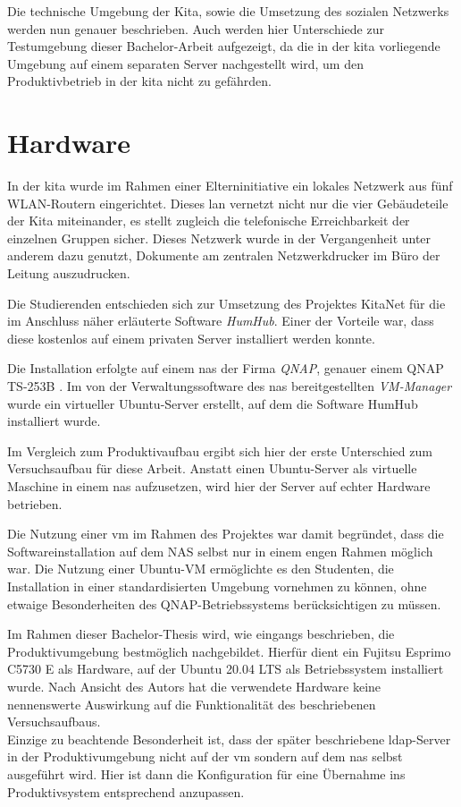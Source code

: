 Die technische Umgebung der Kita, sowie die Umsetzung des sozialen Netzwerks werden nun genauer beschrieben. Auch werden hier Unterschiede zur Testumgebung dieser Bachelor-Arbeit aufgezeigt, da die in der \ac{kita} vorliegende Umgebung auf einem separaten Server nachgestellt wird, um den Produktivbetrieb in der \ac{kita} nicht zu gefährden.

\section{Hardware}

In der \ac{kita} wurde im Rahmen einer Elterninitiative ein lokales Netzwerk  aus fünf WLAN-Routern eingerichtet. Dieses \ac{lan} vernetzt nicht nur die vier Gebäudeteile der Kita miteinander, es stellt zugleich die telefonische Erreichbarkeit der einzelnen Gruppen sicher. Dieses Netzwerk wurde in der Vergangenheit unter anderem dazu genutzt, Dokumente am zentralen Netzwerkdrucker im Büro der Leitung auszudrucken.

Die Studierenden entschieden sich zur Umsetzung des Projektes KitaNet für die im Anschluss näher erläuterte Software \textit{HumHub}.
Einer der Vorteile war, dass diese kostenlos auf einem privaten Server installiert werden konnte. 

Die Installation erfolgte auf einem \ac{nas} der Firma \textit{QNAP}, genauer einem QNAP TS-253B \citep[vgl.][]{qnap}. 
Im von der Verwaltungssoftware des \ac{nas} bereitgestellten \textit{VM-Manager} wurde ein virtueller Ubuntu-Server erstellt, auf dem die Software HumHub installiert wurde.

Im Vergleich zum Produktivaufbau ergibt sich hier der erste Unterschied zum Versuchsaufbau für diese Arbeit.
Anstatt einen Ubuntu-Server als virtuelle Maschine in einem \ac{nas} aufzusetzen, wird hier der Server auf echter Hardware betrieben. 

Die Nutzung einer \ac{vm} im Rahmen des Projektes war damit begründet, dass die Softwareinstallation auf dem NAS selbst nur in einem engen Rahmen möglich war. Die Nutzung einer Ubuntu-VM ermöglichte es den Studenten, die Installation in einer standardisierten Umgebung vornehmen zu können, ohne etwaige Besonderheiten des QNAP-Betriebssystems berücksichtigen zu müssen.

Im Rahmen dieser Bachelor-Thesis wird, wie eingangs beschrieben, die Produktivumgebung bestmöglich nachgebildet. 
Hierfür dient ein Fujitsu Esprimo C5730 E als Hardware, auf der Ubuntu 20.04 LTS als Betriebssystem installiert wurde. 
Nach Ansicht des Autors hat die verwendete Hardware keine nennenswerte Auswirkung auf die Funktionalität des beschriebenen Versuchsaufbaus. \\ 
Einzige zu beachtende Besonderheit ist, dass der später beschriebene \ac{ldap}-Server in der Produktivumgebung nicht auf der \ac{vm} sondern auf dem \ac{nas} selbst ausgeführt wird. Hier ist dann die Konfiguration für eine Übernahme ins Produktivsystem entsprechend anzupassen.

